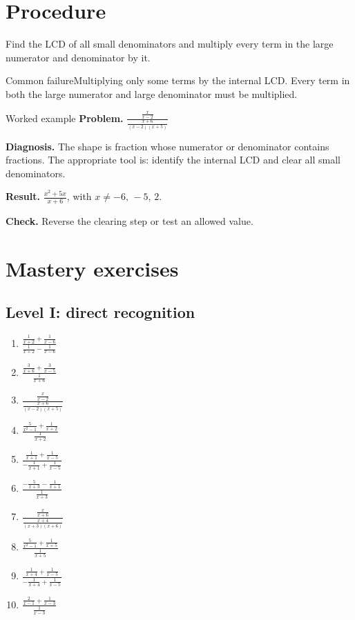 \documentclass[11pt,oneside]{book}
\begin{document}
\section{Procedure}
Find the LCD of all small denominators and multiply every term in the large numerator and denominator by it.

\begin{warningbox}{Common failure}Multiplying only some terms by the internal LCD. Every term in both the large numerator and large denominator must be multiplied.\end{warningbox}
\begin{examplebox}{Worked example}
\textbf{Problem.} $\displaystyle \frac{\frac{x}{x - 2}}{\frac{x + 6}{\left(x - 2\right) \left(x + 5\right)}}$

\textbf{Diagnosis.} The shape is fraction whose numerator or denominator contains fractions. The appropriate tool is: identify the internal LCD and clear all small denominators.

\textbf{Result.} $\displaystyle \frac{x^{2} + 5 x}{x + 6}$, with $x\ne -6,\,-5,\,2$.

\textbf{Check.} Reverse the clearing step or test an allowed value.
\end{examplebox}
\section{Mastery exercises}
\subsection*{Level I: direct recognition}
\begin{enumerate}[leftmargin=*,label=\textbf{\arabic*.},itemsep=0.65\baselineskip]
\item $\displaystyle \frac{\frac{1}{x + 2} + \frac{1}{x - 6}}{\frac{1}{x + 2} - \frac{1}{x - 6}}$
\item $\displaystyle \frac{\frac{3}{x + 6} + \frac{3}{x - 5}}{\frac{1}{x + 6}}$
\item $\displaystyle \frac{\frac{x}{x - 2}}{\frac{x + 6}{\left(x - 2\right) \left(x + 5\right)}}$
\item $\displaystyle \frac{\frac{5}{x^{2} - 1} + \frac{1}{x + 2}}{\frac{1}{x + 2}}$
\item $\displaystyle \frac{\frac{1}{x + 1} + \frac{1}{x - 5}}{- \frac{1}{x + 1} + \frac{1}{x - 5}}$
\item $\displaystyle \frac{- \frac{5}{x + 3} - \frac{1}{x + 1}}{\frac{1}{x + 3}}$
\item $\displaystyle \frac{\frac{x}{x + 6}}{\frac{x + 4}{\left(x + 3\right) \left(x + 6\right)}}$
\item $\displaystyle \frac{\frac{5}{x^{2} - 1} + \frac{1}{x + 5}}{\frac{1}{x + 5}}$
\item $\displaystyle \frac{\frac{1}{x + 4} + \frac{1}{x - 5}}{- \frac{1}{x + 4} + \frac{1}{x - 5}}$
\item $\displaystyle \frac{\frac{2}{x - 1} + \frac{1}{x - 3}}{\frac{1}{x - 3}}$
\end{enumerate}
\end{document}
